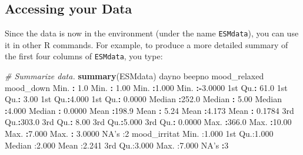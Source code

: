 \documentclass[]{book}
\newenvironment{Shaded}{\begin{snugshade}}{\end{snugshade}}
\newcommand{\KeywordTok}[1]{\textcolor[rgb]{0.13,0.29,0.53}{\textbf{#1}}}
\newcommand{\DecValTok}[1]{\textcolor[rgb]{0.00,0.00,0.81}{#1}}
\newcommand{\FloatTok}[1]{\textcolor[rgb]{0.00,0.00,0.81}{#1}}
\newcommand{\StringTok}[1]{\textcolor[rgb]{0.31,0.60,0.02}{#1}}
\newcommand{\CommentTok}[1]{\textcolor[rgb]{0.56,0.35,0.01}{\textit{#1}}}
\newcommand{\OperatorTok}[1]{\textcolor[rgb]{0.81,0.36,0.00}{\textbf{#1}}}
\newcommand{\NormalTok}[1]{#1}
\begin{document}
\subsection{Accessing your Data}\label{accessing-your-data}

Since the data is now in the environment (under the name
\texttt{ESMdata}), you can use it in other R commands. For example, to
produce a more detailed summary of the first four columns of
\texttt{ESMdata}, you type:

\begin{Shaded}
\begin{Highlighting}[]
\CommentTok{# Summarize data.}
\KeywordTok{summary}\NormalTok{(ESMdata)}
\NormalTok{     dayno           beepno       mood_relaxed     mood_down      }
\NormalTok{ Min.   }\OperatorTok{:}\StringTok{  }\FloatTok{1.0}\NormalTok{   Min.   }\OperatorTok{:}\StringTok{ }\FloatTok{1.00}\NormalTok{   Min.   }\OperatorTok{:}\FloatTok{1.000}\NormalTok{   Min.   }\OperatorTok{:-}\FloatTok{3.0000}  
\NormalTok{ 1st Qu.}\OperatorTok{:}\StringTok{ }\FloatTok{61.0}\NormalTok{   1st Qu.}\OperatorTok{:}\StringTok{ }\FloatTok{3.00}\NormalTok{   1st Qu.}\OperatorTok{:}\FloatTok{4.000}\NormalTok{   1st Qu.}\OperatorTok{:}\StringTok{ }\FloatTok{0.0000}  
\NormalTok{ Median }\OperatorTok{:}\FloatTok{252.0}\NormalTok{   Median }\OperatorTok{:}\StringTok{ }\FloatTok{5.00}\NormalTok{   Median }\OperatorTok{:}\FloatTok{4.000}\NormalTok{   Median }\OperatorTok{:}\StringTok{ }\FloatTok{0.0000}  
\NormalTok{ Mean   }\OperatorTok{:}\FloatTok{198.9}\NormalTok{   Mean   }\OperatorTok{:}\StringTok{ }\FloatTok{5.24}\NormalTok{   Mean   }\OperatorTok{:}\FloatTok{4.173}\NormalTok{   Mean   }\OperatorTok{:}\StringTok{ }\FloatTok{0.1784}  
\NormalTok{ 3rd Qu.}\OperatorTok{:}\FloatTok{303.0}\NormalTok{   3rd Qu.}\OperatorTok{:}\StringTok{ }\FloatTok{8.00}\NormalTok{   3rd Qu.}\OperatorTok{:}\FloatTok{5.000}\NormalTok{   3rd Qu.}\OperatorTok{:}\StringTok{ }\FloatTok{0.0000}  
\NormalTok{ Max.   }\OperatorTok{:}\FloatTok{366.0}\NormalTok{   Max.   }\OperatorTok{:}\FloatTok{10.00}\NormalTok{   Max.   }\OperatorTok{:}\FloatTok{7.000}\NormalTok{   Max.   }\OperatorTok{:}\StringTok{ }\FloatTok{3.0000}  
\NormalTok{                                                 NA}\StringTok{'s   :2        }
\StringTok{  mood_irritat  }
\StringTok{ Min.   :1.000  }
\StringTok{ 1st Qu.:1.000  }
\StringTok{ Median :2.000  }
\StringTok{ Mean   :2.241  }
\StringTok{ 3rd Qu.:3.000  }
\StringTok{ Max.   :7.000  }
\StringTok{ NA'}\NormalTok{s   }\OperatorTok{:}\DecValTok{3}      
\end{Highlighting}
\end{Shaded}
\end{document}
